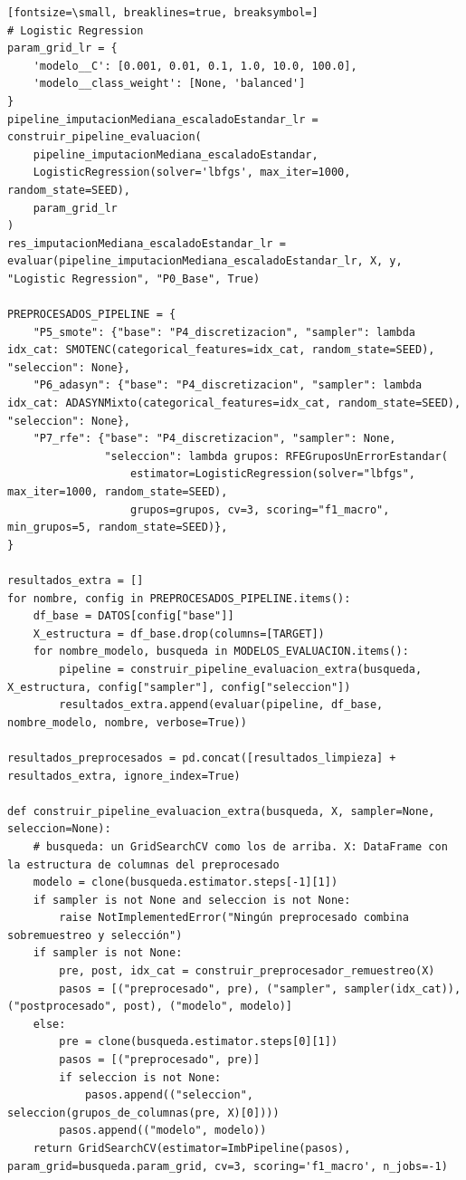 \documentclass[12pt,a4paper,oneside]{book}
\begin{document}
\begin{iaprompt}
\begin{Verbatim}[fontsize=\small, breaklines=true, breaksymbol=]
# Logistic Regression
param_grid_lr = {
    'modelo__C': [0.001, 0.01, 0.1, 1.0, 10.0, 100.0],
    'modelo__class_weight': [None, 'balanced']
}
pipeline_imputacionMediana_escaladoEstandar_lr = construir_pipeline_evaluacion(
    pipeline_imputacionMediana_escaladoEstandar,
    LogisticRegression(solver='lbfgs', max_iter=1000, random_state=SEED),
    param_grid_lr
)
res_imputacionMediana_escaladoEstandar_lr = evaluar(pipeline_imputacionMediana_escaladoEstandar_lr, X, y, "Logistic Regression", "P0_Base", True)

PREPROCESADOS_PIPELINE = {
    "P5_smote": {"base": "P4_discretizacion", "sampler": lambda idx_cat: SMOTENC(categorical_features=idx_cat, random_state=SEED), "seleccion": None},
    "P6_adasyn": {"base": "P4_discretizacion", "sampler": lambda idx_cat: ADASYNMixto(categorical_features=idx_cat, random_state=SEED), "seleccion": None},
    "P7_rfe": {"base": "P4_discretizacion", "sampler": None,
               "seleccion": lambda grupos: RFEGruposUnErrorEstandar(
                   estimator=LogisticRegression(solver="lbfgs", max_iter=1000, random_state=SEED),
                   grupos=grupos, cv=3, scoring="f1_macro", min_grupos=5, random_state=SEED)},
}

resultados_extra = []
for nombre, config in PREPROCESADOS_PIPELINE.items():
    df_base = DATOS[config["base"]]
    X_estructura = df_base.drop(columns=[TARGET])
    for nombre_modelo, busqueda in MODELOS_EVALUACION.items():
        pipeline = construir_pipeline_evaluacion_extra(busqueda, X_estructura, config["sampler"], config["seleccion"])
        resultados_extra.append(evaluar(pipeline, df_base, nombre_modelo, nombre, verbose=True))

resultados_preprocesados = pd.concat([resultados_limpieza] + resultados_extra, ignore_index=True)

def construir_pipeline_evaluacion_extra(busqueda, X, sampler=None, seleccion=None):
    # busqueda: un GridSearchCV como los de arriba. X: DataFrame con la estructura de columnas del preprocesado
    modelo = clone(busqueda.estimator.steps[-1][1])
    if sampler is not None and seleccion is not None:
        raise NotImplementedError("Ningún preprocesado combina sobremuestreo y selección")
    if sampler is not None:
        pre, post, idx_cat = construir_preprocesador_remuestreo(X)
        pasos = [("preprocesado", pre), ("sampler", sampler(idx_cat)), ("postprocesado", post), ("modelo", modelo)]
    else:
        pre = clone(busqueda.estimator.steps[0][1])
        pasos = [("preprocesado", pre)]
        if seleccion is not None:
            pasos.append(("seleccion", seleccion(grupos_de_columnas(pre, X)[0])))
        pasos.append(("modelo", modelo))
    return GridSearchCV(estimator=ImbPipeline(pasos), param_grid=busqueda.param_grid, cv=3, scoring='f1_macro', n_jobs=-1)



\end{Verbatim}
\end{iaprompt}
\end{document}
